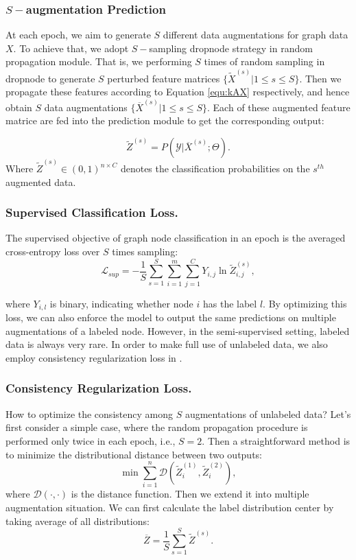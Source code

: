 { 
\subsubsection{$S-$augmentation Prediction}
At each epoch, we aim to generate $S$ different data augmentations for graph data $X$. To achieve that, we adopt $S-$sampling dropnode strategy in random propagation module. That is, we performing $S$ times of random sampling in dropnode to generate $S$ perturbed feature matrices $\{\widetilde{X}^{(s)}|1\leq s \leq S\}$. Then we propagate these features according to Equation \ref{equ:kAX} respectively, and hence obtain $S$ data augmentations $\{\overline{X}^{(s)}|1 \leq s \leq S\}$. Each of these augmented feature matrice are fed into the prediction module to get the corresponding output:

\begin{equation}
     \widetilde{Z}^{(s)} = P(\mathcal{Y}|\overline{X}^{(s)}; \Theta).
 \end{equation}
Where $\widetilde{Z}^{(s)} \in (0,1)^{n\times C}$ denotes the classification probabilities on the $s^{th}$ augmented data. 
\subsubsection{Supervised Classification Loss.}
The supervised objective of graph node classification in an epoch is the averaged cross-entropy loss over $S$ times sampling:
\begin{equation}
\label{equ:loss}
	\mathcal{L}_{sup} = -\frac{1}{S}\sum_{s=1}^{S}\sum_{i=1}^m \sum_{j=1}^{C}Y_{i,j} \ln \widetilde{Z}_{i,j}^{(s)} ,
\end{equation}

\noindent where $Y_{i,l}$ is binary, indicating whether node $i$ has the label $l$. By optimizing this loss, we can also enforce the model to output the same predictions on multiple augmentations of a labeled node.
 However, in the semi-supervised setting, labeled data is always very rare. In order to make full use of unlabeled data, we also employ consistency regularization loss in \model. 
 
\subsubsection{Consistency Regularization Loss.} How to optimize the consistency among $S$ augmentations of unlabeled data? 
 Let's first consider a simple case, where the random propagation procedure is performed only twice in each epoch, i.e., $S=2$. Then a straightforward method is to minimize the distributional distance between two outputs:
 \begin{equation}
 \label{equ:2d}
     \min \sum_{i=1}^n \mathcal{D}(\widetilde{Z}^{(1)}_i, \widetilde{Z}^{(2)}_i),
 \end{equation}
where $ \mathcal{D}(\cdot,\cdot)$ is the distance function. Then we extend it into multiple augmentation situation. We can first calculate the label distribution center by taking average of all distributions:
\begin{equation}
    \overline{Z} = \frac{1}{S}\sum_{s=1}^{S} \widetilde{Z}^{(s)}.
\end{equation}

}
